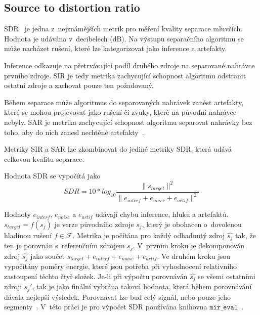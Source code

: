 \subsection{Source to distortion ratio}
SDR~\cite{vincent-inria-00544230} je jedna z~nejznámějších metrik pro měření kvality separace mluvčích. Hodnota je udávána v~decibelech (dB). Na výstupu separačního algoritmu se může nacházet rušení, které lze kategorizovat jako inference a artefakty. 

Inference odkazuje na přetrvávající podíl druhého zdroje na separované nahrávce prvního zdroje. SIR je tedy metrika zachycující schopnost algoritmu odstranit ostatní zdroje a zachovat pouze ten požadovaný.

Během separace může algoritmus do separovaných nahrávek zanést artefakty, které se mohou projevovat jako rušení či zvuky, které na původní nahrávce nebyly. SAR je metrika zachycující schopnost algoritmu separovat nahrávky bez toho, aby do nich zanesl nechtěné artefakty~\cite{venkataramani2018performance}.

Metriky SIR a SAR lze zkombinovat do jediné metriky SDR, která udává celkovou kvalitu separace. 

Hodnota SDR se vypočítá jako 
\begin{equation}
  SDR = 10*log_{10}\frac{\|s_{target}\|^2}{\|e_{interf} + e_{noise} + e_{artif}\|^2}
\end{equation}

Hodnoty $e_{interf}$, $e_{noise}$ a $e_{artif}$ udávají chybu inference, hluku a artefaktů. $s_{target} = f(s_j)$ je verze původního zdroje $s_j$, který je obohacen o~dovolenou hladinou rušení $f \in \mathcal{F}$. Metrika je počítána pro každý odhadnutý zdroj $\hat{s_j}$ tak, že ten je porovnán s~referenčním zdrojem $s_j$. V~prvním kroku je dekomponován zdroj $\hat{s_j}$ jako součet $s_{target} + e_{interf} + e_{noise} + e_{artif}$. Ve druhém kroku jsou vypočítány poměry energie, které jsou potřeba při vyhodnocení relativního zastoupení těchto čtyř složek. Je-li při výpočtu porovnáván $\hat{s_j}$ se všemi ostatními zdroji $s_j'$, tak je jako finální vybrána taková hodnota, která během porovnávání dávala nejlepší výsledek. Porovnávat lze buď celý signál, nebo pouze jeho segmenty~\cite{vincent-inria-00544230}. V~této práci je pro výpočet SDR používána knihovna $\texttt{mir\_eval}$~\cite{mir-eval}.





